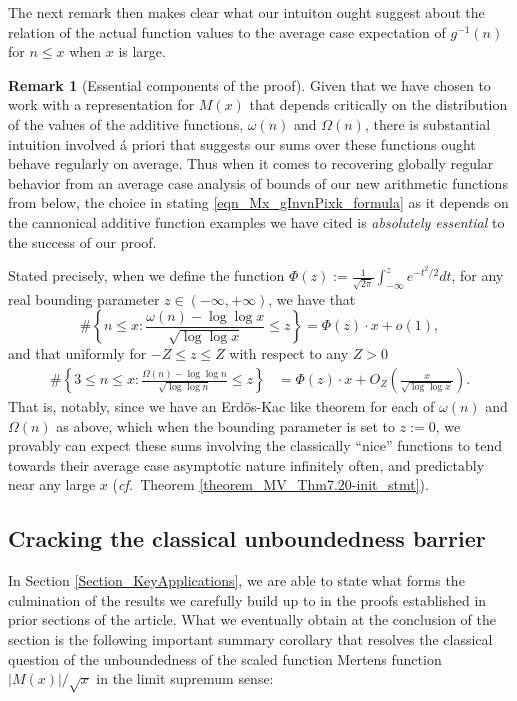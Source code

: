 \documentclass[11pt,reqno,a4letter]{article}
\numberwithin{figure}{section}
\numberwithin{table}{section}
\newcommand{\cf}{\textit{cf.\ }}
\theoremstyle{plain}
\numberwithin{theorem}{section}
\theoremstyle{definition}
\newtheorem{remark}[theorem]{Remark}
\begin{document}
The next remark then makes clear what our intuiton ought suggest about the relation of 
the actual function values to the average case expectation of $g^{-1}(n)$ for $n \leq x$ when 
$x$ is large. 

\begin{remark}[Essential components of the proof]
Given that we have chosen to work with a representation for $M(x)$ that depends critically on 
the distribution of the values of the additive functions, $\omega(n)$ and $\Omega(n)$, there is 
substantial intuition involved \'{a} priori that suggests our sums over these functions ought 
behave regularly on average. 
Thus when it comes to recovering globally regular behavior from an 
average case analysis of bounds of our new arithmetic functions from below, 
the choice in stating \eqref{eqn_Mx_gInvnPixk_formula} as it depends on the 
cannonical additive function examples we have cited is 
\emph{absolutely essential} to the success of our proof.  

Stated precisely, when we define the function 
$\Phi(z) := \frac{1}{\sqrt{2\pi}} \int_{-\infty}^{z} e^{-t^2/2} dt$,  
for any real bounding parameter $z \in (-\infty, +\infty)$, we have that 
\cite[\S 1.7]{IWANIEC-KOWALSKI} 
\[
\#\left\{n \leq x: \frac{\omega(n) - \log\log x}{\sqrt{\log\log x}} \leq z\right\} = 
     \Phi(z) \cdot x + o(1), 
\]
and that uniformly for $-Z \leq z \leq Z$ with respect to any $Z > 0$ \cite[\S 7.4]{MV} 
\begin{align*} 
\#\left\{3 \leq n \leq x: \frac{\Omega(n) - \log\log n}{\sqrt{\log\log n}} \leq z\right\} & = 
     \Phi(z) \cdot x + O_Z\left(\frac{x}{\sqrt{\log\log x}}\right). 
\end{align*} 
That is, notably, since we have an Erd\"os-Kac like theorem for each of 
$\omega(n)$ and $\Omega(n)$ as above, which when the bounding parameter is set to $z := 0$, we provably 
can expect these sums involving the classically ``nice'' functions to tend towards their 
average case asymptotic nature infinitely often, and predictably near any large $x$ 
(\cf Theorem \ref{theorem_MV_Thm7.20-init_stmt}). 
\end{remark} 

\subsection{Cracking the classical unboundedness barrier} 

In Section \ref{Section_KeyApplications}, 
we are able to state what forms the culmination of the results 
we carefully build up to in the proofs established in prior sections of the article. 
What we eventually obtain at the conclusion of the section 
is the following important summary corollary that resolves the classical question of the 
unboundedness of the scaled function Mertens function 
$|M(x)| / \sqrt{x}$ in the limit supremum sense: 
\end{document}
